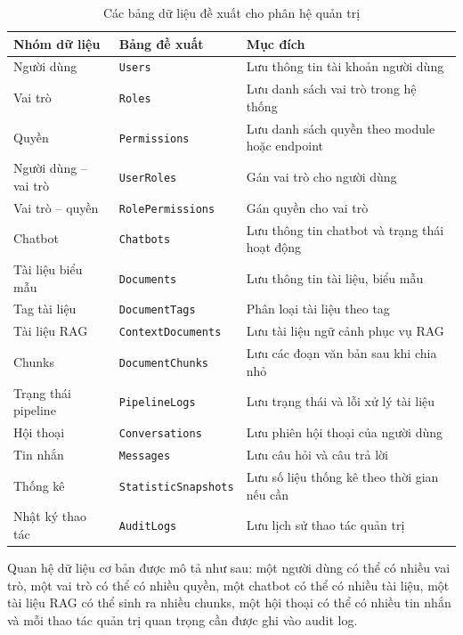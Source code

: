 \begin{table}[H]
\centering
\caption{Các bảng dữ liệu đề xuất cho phân hệ quản trị}
\label{tab:admin-db}
\begin{tabular}{|p{4cm}|p{5cm}|p{6cm}|}
\hline
\textbf{Nhóm dữ liệu} & \textbf{Bảng đề xuất} & \textbf{Mục đích} \\ \hline
Người dùng & \texttt{Users} & Lưu thông tin tài khoản người dùng \\ \hline
Vai trò & \texttt{Roles} & Lưu danh sách vai trò trong hệ thống \\ \hline
Quyền & \texttt{Permissions} & Lưu danh sách quyền theo module hoặc endpoint \\ \hline
Người dùng -- vai trò & \texttt{UserRoles} & Gán vai trò cho người dùng \\ \hline
Vai trò -- quyền & \texttt{RolePermissions} & Gán quyền cho vai trò \\ \hline
Chatbot & \texttt{Chatbots} & Lưu thông tin chatbot và trạng thái hoạt động \\ \hline
Tài liệu biểu mẫu & \texttt{Documents} & Lưu thông tin tài liệu, biểu mẫu \\ \hline
Tag tài liệu & \texttt{DocumentTags} & Phân loại tài liệu theo tag \\ \hline
Tài liệu RAG & \texttt{ContextDocuments} & Lưu tài liệu ngữ cảnh phục vụ RAG \\ \hline
Chunks & \texttt{DocumentChunks} & Lưu các đoạn văn bản sau khi chia nhỏ \\ \hline
Trạng thái pipeline & \texttt{PipelineLogs} & Lưu trạng thái và lỗi xử lý tài liệu \\ \hline
Hội thoại & \texttt{Conversations} & Lưu phiên hội thoại của người dùng \\ \hline
Tin nhắn & \texttt{Messages} & Lưu câu hỏi và câu trả lời \\ \hline
Thống kê & \texttt{StatisticSnapshots} & Lưu số liệu thống kê theo thời gian nếu cần \\ \hline
Nhật ký thao tác & \texttt{AuditLogs} & Lưu lịch sử thao tác quản trị \\ \hline
\end{tabular}
\end{table}

Quan hệ dữ liệu cơ bản được mô tả như sau: một người dùng có thể có nhiều vai trò, một vai trò có thể có nhiều quyền, một chatbot có thể có nhiều tài liệu, một tài liệu RAG có thể sinh ra nhiều chunks, một hội thoại có thể có nhiều tin nhắn và mỗi thao tác quản trị quan trọng cần được ghi vào audit log.

